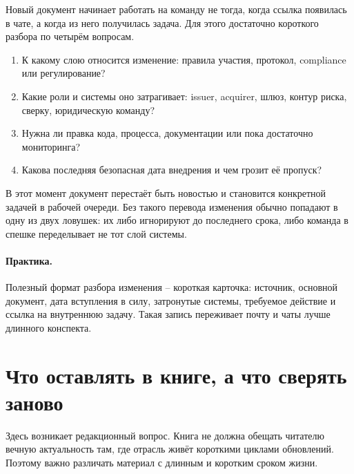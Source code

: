 Новый документ начинает работать на команду не тогда, когда ссылка
появилась в чате, а когда из него получилась задача. Для этого
достаточно короткого разбора по четырём вопросам.

\begin{enumerate}
  \item К какому слою относится изменение: правила участия, протокол,
    compliance или регулирование?
  \item Какие роли и системы оно затрагивает: issuer, acquirer,
    шлюз, контур риска, сверку, юридическую команду?
  \item Нужна ли правка кода, процесса, документации или пока
    достаточно мониторинга?
  \item Какова последняя безопасная дата внедрения и чем грозит
    её пропуск?
\end{enumerate}

В этот момент документ перестаёт быть новостью и становится
конкретной задачей в рабочей очереди. Без такого перевода изменения
обычно попадают в одну из двух ловушек: их либо игнорируют
до последнего срока, либо команда в спешке переделывает
не тот слой системы.

\paragraph{Практика.}
Полезный формат разбора изменения -- короткая карточка: источник,
основной документ, дата вступления в силу, затронутые системы,
требуемое действие и ссылка на внутреннюю задачу. Такая запись
переживает почту и чаты лучше длинного конспекта.

\section{Что оставлять в книге, а что сверять заново}
\label{sec:ps-tracking-book-vs-reference}

Здесь возникает редакционный вопрос. Книга не должна обещать
читателю вечную актуальность там, где отрасль живёт короткими
циклами обновлений. Поэтому важно различать материал
с длинным и коротким сроком жизни.

